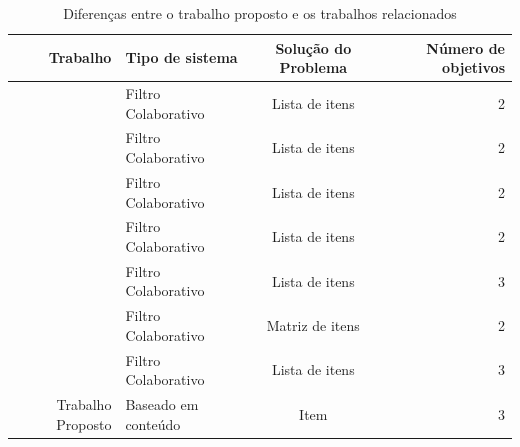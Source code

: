 \begin{table}[h]
\label{diferencas}
\centering
\caption{Diferenças entre o trabalho proposto e os trabalhos relacionados}
\vspace{0.5cm}
\begin{tabular}{r|l|c|r}Trabalho & Tipo de sistema & Solução do Problema & Número de objetivos \\ 
\hline                               %
\cite{irfan2015mobicontext} & Filtro Colaborativo & Lista de itens & 2\\ \hline  
\cite{wang2014decomposition} & Filtro Colaborativo & Lista de itens & 2 \\ \hline  
\cite{wang2017multiobjective} & Filtro Colaborativo & Lista de itens & 2 \\ \hline
\cite{zheng2018utility} & Filtro Colaborativo & Lista de itens & 2 \\ \hline
\cite{ribeiro2015multiobjective} & Filtro Colaborativo & Lista de itens & 3 \\ \hline
\cite{zuo2015personalized} & Filtro Colaborativo & Matriz de itens & 2 \\ \hline
\cite{oliveira2018multi} & Filtro Colaborativo & Lista de itens & 3 \\ \hline
Trabalho Proposto & Baseado em conteúdo & Item & 3 \\ \hline

\end{tabular}
\end{table}